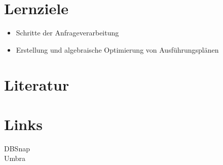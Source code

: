 \section*{Lernziele}

\begin{itemize}
	\item Schritte der Anfrageverarbeitung
	\item Erstellung und algebraische Optimierung von Ausführungsplänen
\end{itemize}

\section*{Literatur}




\section*{Links}
\begin{description}
	\item[DBSnap] \DBSnap
	\item[Umbra] \Umbra
\end{description}

